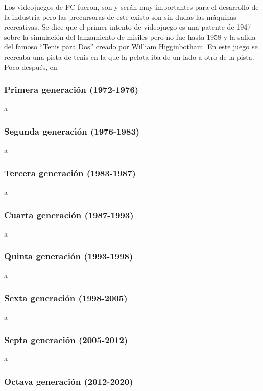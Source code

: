 Los videojuegos de PC fueron, son y ser\'an muy importantes para el desarrollo de la industria pero las precursoras de este existo son sin dudas las m\'aquinas recreativas. Se dice que el primer intento de videojuego es una patente de 1947 sobre la simulaci\'on del lanzamiento de misiles pero no fue hasta 1958 y la salida del famoso ``Tenis para Dos''\cite{tenispara2} creado por William Higginbotham. En este juego se recreaba una pista de tenis en la que la pelota iba de un lado a otro de la pista. Poco despu\'es, en 


\subsubsection{Primera generaci\'on (1972-1976)}
a
\subsubsection{Segunda generaci\'on (1976-1983)}
a

\subsubsection{Tercera generaci\'on (1983-1987)}

a

\subsubsection{Cuarta generaci\'on (1987-1993)}


a

\subsubsection{Quinta generaci\'on (1993-1998)}

a

\subsubsection{Sexta generaci\'on (1998-2005)}

a


\subsubsection{Septa generaci\'on (2005-2012)}


a

\subsubsection{Octava generaci\'on (2012-2020)}

